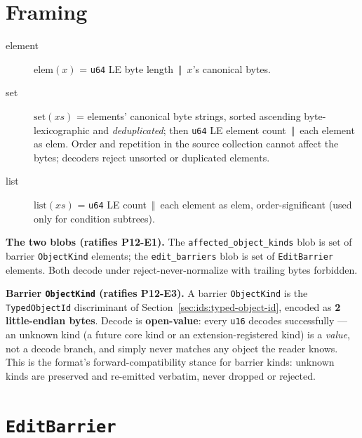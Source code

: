 \documentclass[11pt,letterpaper]{report}
\newcounter{requirement}[chapter]
\newcommand{\cat}{\ensuremath{\,\Vert\,}}
\begin{document}
\section{Framing}
\label{sec:barriers:framing}

\begin{description}
  \item[element] $\mathrm{elem}(x)$ = \texttt{u64} LE byte length \cat{}
    $x$'s canonical bytes.
  \item[set] $\mathrm{set}(xs)$ = elements' canonical byte strings, sorted
    ascending byte-lexicographic and \emph{deduplicated}; then \texttt{u64}
    LE element count \cat{} each element as $\mathrm{elem}$. Order and
    repetition in the source collection cannot affect the bytes; decoders
    reject unsorted or duplicated elements.
  \item[list] $\mathrm{list}(xs)$ = \texttt{u64} LE count \cat{} each
    element as $\mathrm{elem}$, order-significant (used only for condition
    subtrees).
\end{description}

\begin{requirement}
\label{req:binfmt:ext-blobs}
\textbf{The two blobs (ratifies P12-E1).} The
\texttt{affected\_object\_kinds} blob is $\mathrm{set}$ of barrier
\texttt{ObjectKind} elements; the \texttt{edit\_barriers} blob is
$\mathrm{set}$ of \texttt{EditBarrier} elements. Both decode under
reject-never-normalize with trailing bytes forbidden.
\end{requirement}

\begin{requirement}
\label{req:binfmt:object-kind-open}
\textbf{Barrier \texttt{ObjectKind} (ratifies P12-E3).} A barrier
\texttt{ObjectKind} is the \texttt{TypedObjectId} discriminant of
Section~\ref{sec:ids:typed-object-id}, encoded as \textbf{2 little-endian
bytes}. Decode is \textbf{open-value}: every \texttt{u16} decodes
successfully --- an unknown kind (a future core kind or an
extension-registered kind) is a \emph{value}, not a decode branch, and
simply never matches any object the reader knows. This is the format's
forward-compatibility stance for barrier kinds: unknown kinds are preserved
and re-emitted verbatim, never dropped or rejected.
\end{requirement}

\section{\texttt{EditBarrier}}
\label{sec:barriers:barrier}
\end{document}
